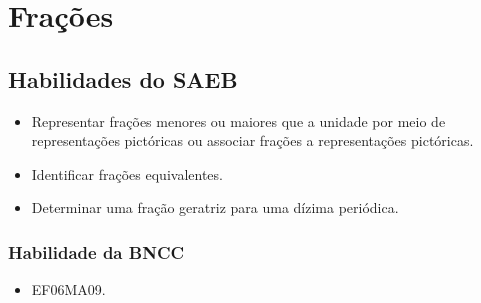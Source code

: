 \chapter{Frações}

\section{Habilidades do SAEB}
\begin{itemize}
\item Representar frações menores ou maiores que a
unidade por meio de representações pictóricas ou associar frações a
representações pictóricas.
\item
  Identificar frações equivalentes.
\item
  Determinar uma fração geratriz para uma dízima periódica.
\end{itemize}

\subsection{Habilidade da BNCC} 
\begin{itemize}
\item EF06MA09.
\end{itemize}

